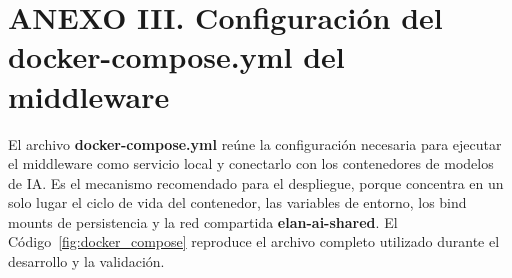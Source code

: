 
\section*{\normalfont ANEXO III. Configuración del docker-compose.yml del middleware}
\label{anx:docker_compose}

\renewcommand{\thetable}{C.\arabic{table}}
\setcounter{table}{0}
\renewcommand{\thecodigo}{C.\arabic{codigo}}
\setcounter{codigo}{0}
\renewcommand{\thefigure}{C.\arabic{figure}}
\setcounter{figure}{0}

El archivo \textbf{docker-compose.yml} reúne la configuración necesaria para ejecutar el middleware como servicio local y conectarlo con los contenedores de modelos de IA. Es el mecanismo recomendado para el despliegue, porque concentra en un solo lugar el ciclo de vida del contenedor, las variables de entorno, los bind mounts de persistencia y la red compartida \textbf{elan-ai-shared}. El Código~\ref{fig:docker_compose} reproduce el archivo completo utilizado durante el desarrollo y la validación.

